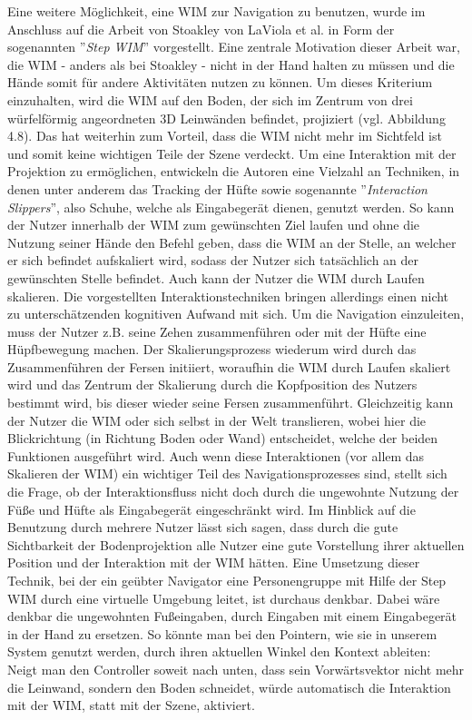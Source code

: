 Eine weitere Möglichkeit, eine WIM zur Navigation zu benutzen, wurde im Anschluss auf die Arbeit von Stoakley von LaViola et al. \cite{LaViola2004Hands-freeEnvironments} in Form der sogenannten  ”\textit{Step WIM}”  vorgestellt.
Eine zentrale Motivation dieser Arbeit war, die WIM - anders als bei Stoakley - nicht in der Hand halten zu müssen und die Hände somit für andere Aktivitäten nutzen zu können. 
Um dieses Kriterium einzuhalten, wird die WIM auf den Boden, der sich im Zentrum von drei würfelförmig angeordneten 3D Leinwänden befindet, projiziert (vgl. Abbildung 4.8). Das hat weiterhin zum Vorteil, dass die WIM nicht mehr im Sichtfeld ist und somit keine wichtigen Teile der Szene verdeckt. 
Um eine Interaktion mit der Projektion zu ermöglichen, entwickeln die Autoren eine Vielzahl an Techniken, in denen unter anderem das Tracking der Hüfte sowie sogenannte ”\textit{Interaction Slippers}”, also Schuhe, welche als Eingabegerät dienen, genutzt werden.
So kann der Nutzer innerhalb der WIM zum gewünschten Ziel laufen und ohne die Nutzung seiner Hände den Befehl geben, dass die WIM an der Stelle, an welcher er sich befindet aufskaliert wird, sodass der Nutzer sich tatsächlich an der gewünschten Stelle befindet.
Auch kann der Nutzer die WIM durch Laufen skalieren. Die vorgestellten Interaktionstechniken bringen allerdings einen nicht zu unterschätzenden kognitiven Aufwand mit sich. 
Um die Navigation einzuleiten, muss der Nutzer z.B. seine Zehen zusammenführen oder mit der Hüfte eine Hüpfbewegung machen. Der Skalierungsprozess wiederum wird durch das Zusammenführen der Fersen initiiert, woraufhin die WIM durch Laufen skaliert wird und das Zentrum der Skalierung durch die Kopfposition des Nutzers bestimmt wird, bis dieser wieder seine Fersen zusammenführt. Gleichzeitig kann der Nutzer die WIM oder sich selbst in der Welt translieren, wobei hier die Blickrichtung (in Richtung Boden oder Wand) entscheidet, welche der beiden Funktionen ausgeführt wird.
Auch wenn diese Interaktionen (vor allem das Skalieren der WIM) ein wichtiger Teil des Navigationsprozesses sind, stellt sich die Frage, ob der Interaktionsfluss nicht doch durch die ungewohnte Nutzung der Füße und Hüfte als Eingabegerät eingeschränkt wird.
Im Hinblick auf die Benutzung durch mehrere Nutzer lässt sich sagen, dass durch die gute Sichtbarkeit der Bodenprojektion alle Nutzer eine gute Vorstellung ihrer aktuellen Position und der Interaktion mit der WIM hätten. Eine Umsetzung dieser Technik, bei der ein geübter Navigator eine Personengruppe mit Hilfe der Step WIM durch eine virtuelle Umgebung leitet, ist durchaus denkbar. Dabei wäre denkbar die ungewohnten Fußeingaben, durch Eingaben mit einem Eingabegerät in der Hand zu ersetzen. So könnte man bei den Pointern, wie sie in unserem System genutzt werden, durch ihren aktuellen Winkel den Kontext ableiten: Neigt man den Controller soweit nach unten, dass sein Vorwärtsvektor nicht mehr die Leinwand, sondern den Boden schneidet, würde automatisch die Interaktion mit der WIM, statt mit der Szene, aktiviert.\\

